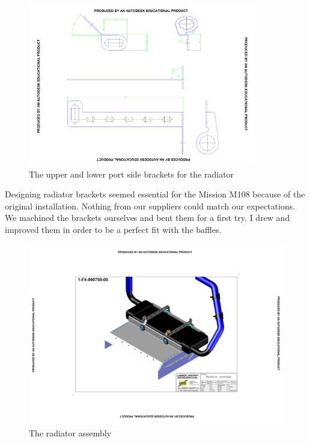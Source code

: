 \documentclass[11pt,a4paper]{article}
\begin{document}
\begin{figure}[ht!]
	\begin{center}
		\includegraphics[width=10cm,trim = 2cm 1cm 2cm 1cm, clip]{pics/PIC007.pdf}
		\caption{The upper and lower port side brackets for the radiator}
		\label{fig:PIC007}
	\end{center}
\end{figure}

Designing radiator brackets seemed essential for the Mission M108 because of the original installation. Nothing from our suppliers could match our expectations. We machined the brackets ourselves and bent them for a first try. I drew and improved them in order to be a perfect fit with the baffles.

\begin{figure}[ht!]
	\begin{center}
		\includegraphics[width=15cm,trim = 5cm 5cm 5cm 5cm, clip]{pics/PIC008.pdf}
		\caption{The radiator assembly}
		\label{fig:PIC008}
	\end{center}
\end{figure}
\end{document}

